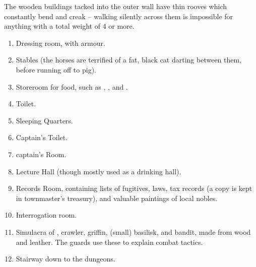 \begin{multicols}{2}
The wooden buildings tacked into the outer wall have thin rooves which constantly bend and creak -- walking silently across them is impossible for anything with a total \gls{weight} of 4 or more.

\begin{enumerate}
  \item
  Dressing room, with armour.
  \label{stationDressing}
  \item
  Stables\label{stationStables} (the horses are terrified of a fat, black cat darting between them, before running off to \gls{pig}).
  \item
  Storeroom for food, such as \rations, \rations, and \rations.
  \label{stationStorage}
  \item
  Toilet.
  \label{stationToilet}
  \item
  Sleeping Quarters.
  \label{stationSleep}
  \item
  Captain's Toilet.
  \label{stationCaptainToilet}
  \item
  \gls{captain}'s Room.
  \label{stationCaptainRoom}
  \item
  Lecture Hall (though mostly used as a drinking hall).
  \label{stationLecture}
  \item
  Records Room, containing lists of fugitives, laws, tax records (a copy is kept in \gls{townmaster}'s treasury), and valuable paintings of local nobles.
  \label{stationRecords}
  \item
  Interrogation room.
  \label{stationInterrogation}
  \item
    Simulacra of , \gls{crawler}, griffin, (small) \gls{basilisk}, and bandit, made from wood and leather.
  The guards use these to explain combat tactics.
  \label{stationShrine}
  \item
  Stairway down to the dungeons.
  \label{stationStairs}
\end{enumerate}

\end{multicols}

